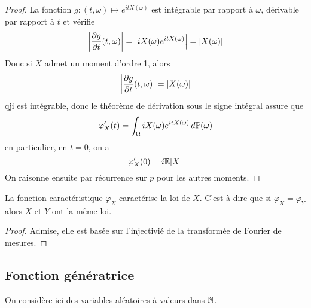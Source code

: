 \begin{proof}
    La fonction \(g:(t,\omega)\mapsto e^{itX(\omega)}\) est intégrable par rapport à \(\omega\),
    dérivable par rapport à \(t\) et vérifie
    \begin{equation*}
        \mathopen{}\left|\frac{\partial g}{\partial t}(t,\omega)\right|\mathclose{} = \mathopen{}\left|iX(\omega)e^{itX(\omega)}\right|\mathclose{}=\mathopen{}\left|X(\omega)\right|\mathclose{}
    \end{equation*}
    Donc si \(X\) admet un moment d'ordre 1, alors
    \begin{equation*}
        \mathopen{}\left|\frac{\partial g}{\partial t}(t,\omega)\right|\mathclose{} = \mathopen{}\left|X(\omega)\right|\mathclose{}
    \end{equation*}
    qji est intégrable, donc le théorème de dérivation sous le signe intégral assure que
    \begin{equation*}
        \varphi_X'(t) = \int_{\Omega} iX(\omega)e^{itX(\omega)}\mathop{}\!{d}\mathbb{P}(\omega)
    \end{equation*}
    en particulier, en \(t=0\), on a
    \begin{equation*}
        \varphi_X'(0) = i\mathbb{E}\mathopen{}\left[X\right]\mathclose{}
    \end{equation*}
    On raisonne ensuite par récurrence sur \(p\) pour les autres moments.
\end{proof}

\begin{theorem}
    La fonction caractéristique \(\varphi_X\) caractérise la loi de \(X\). C'est-à-dire que si
    \(\varphi_X = \varphi_Y\) alors \(X\) et \(Y\) ont la même loi.
\end{theorem}

\begin{proof}
    Admise, elle est basée sur l'injectivié de la transformée de Fourier de mesures.
\end{proof}

\subsection{Fonction génératrice}

On considère ici des variables aléatoires à valeurs dans \(\mathbb{N}\).

